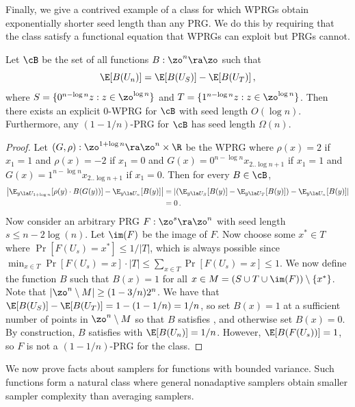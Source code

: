 \documentclass{toc}
\begin{document}
Finally, we give a contrived example of a class for which WPRGs obtain exponentially shorter seed length than any PRG. We do this by requiring that the class satisfy a functional equation that WPRGs can exploit but PRGs cannot.
\begin{proposition}
Let $\cB$ be the set of all functions $B:\zo^n\ra\zo$ such that 
\begin{equation}\label{eqn:functional}
    \E[B(U_n)] = \E[B(U_S)]-\E[B(U_T)]\,,  %
\end{equation}
where $S=\{0^{n-\log n}z:z\in \zo^{\log n}\}$ and $T=\{1^{n-\log n}z:z\in \zo^{\log n}\}$. Then there exists an explicit 0-WPRG for $\cB$ with seed length $O(\log n)$. Furthermore, any $(1-1/n)$-PRG for $\cB$ has seed length $\Omega(n)$.
\end{proposition}
\begin{proof}
Let $(G,\rho):\zo^{1+\log n}\ra\zo^n\times \R$ be the WPRG where $\rho(x)=2$ if $x_1=1$ and $\rho(x)=-2$ if $x_1=0$ and $G(x)=0^{n-\log n}x_{2..\log n+1}$ if $x_1=1$ and $G(x)=1^{n-\log n}x_{2..\log n+1}$ if $x_1=0$. Then for every $B\in \cB$,
\begin{align*}
    \left|\E_{y\la U_{1+\log n}}[\rho(y)\cdot B(G(y))] - \E_{y\la U_n}[B(y)]\right| &= \left|\left(\E_{y\la U_{S}}[B(y)]-\E_{y\la U_T}[B(y)]\right) - \E_{y\la U_n}[B(y)]\right|\\
    &= 0\,.     %
\end{align*}
Now consider an arbitrary PRG $F:\zo^s\ra\zo^n$ with seed length $s\leq n-2\log(n)$. Let $\im(F)$ be the image of $F$. Now choose some $x^*\in T$ where $\Pr[F(U_s)=x^*]\leq 1/|T|$, which is always possible since $\min_{x\in T}\Pr[F(U_s)=x]\cdot |T|\leq \sum_{x\in T}\Pr[F(U_s)=x]\leq 1$. We now define the function $B$ such that $B(x)=1$ for all $x\in M=(S\cup T \cup \im(F))\setminus \{x^*\}$. Note that $|\zo^n\setminus M| \geq (1-3/n)2^n$. %
We have that $\E[B(U_S)]-\E[B(U_T)]=1-(1-1/n)=1/n$, so set $B(x)=1$ at a sufficient number of points in $\zo^n\setminus M$ so that $B$ satisfies , and otherwise set $B(x)=0$. By construction, $B$ satisfies  with $\E[B(U_n)]=1/n$. However, $\E[B(F(U_s))]=1$, so $F$ is not a $(1-1/n)$-PRG for the class.
\end{proof}

We now prove facts about samplers for functions with bounded variance. Such functions form a natural class where general nonadaptive samplers obtain smaller sampler complexity than averaging samplers.
\end{document}
